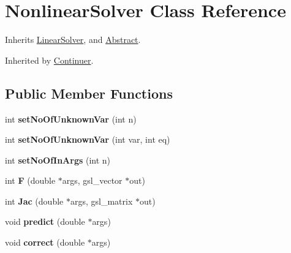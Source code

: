 \hypertarget{class_nonlinear_solver}{
\section{NonlinearSolver Class Reference}
\label{class_nonlinear_solver}
}


Inherits \hyperlink{class_linear_solver}{LinearSolver}, and \hyperlink{class_abstract}{Abstract}.

Inherited by \hyperlink{class_continuer}{Continuer}.\subsection*{Public Member Functions}
\begin{DoxyCompactItemize}
\item 
\hypertarget{class_nonlinear_solver_a0199c1755fe89dad01ea9855f22f32d4}{
int {\bfseries setNoOfUnknownVar} (int n)}
\label{class_nonlinear_solver_a0199c1755fe89dad01ea9855f22f32d4}

\item 
\hypertarget{class_nonlinear_solver_abb22c855c950b52df00301f5d5557d09}{
int {\bfseries setNoOfUnknownVar} (int var, int eq)}
\label{class_nonlinear_solver_abb22c855c950b52df00301f5d5557d09}

\item 
\hypertarget{class_nonlinear_solver_a053187f06cc0326b48504d9d50738fd8}{
int {\bfseries setNoOfInArgs} (int n)}
\label{class_nonlinear_solver_a053187f06cc0326b48504d9d50738fd8}

\item 
\hypertarget{class_nonlinear_solver_a0b04d8997db805338504584f400bd89b}{
int {\bfseries F} (double $\ast$args, gsl\_\-vector $\ast$out)}
\label{class_nonlinear_solver_a0b04d8997db805338504584f400bd89b}

\item 
\hypertarget{class_nonlinear_solver_aa501af12fe0e1c93a602f11d08b4f9d1}{
int {\bfseries Jac} (double $\ast$args, gsl\_\-matrix $\ast$out)}
\label{class_nonlinear_solver_aa501af12fe0e1c93a602f11d08b4f9d1}

\item 
\hypertarget{class_nonlinear_solver_afda0787a32bd2ba86dfc9398b6a2b2f2}{
void {\bfseries predict} (double $\ast$args)}
\label{class_nonlinear_solver_afda0787a32bd2ba86dfc9398b6a2b2f2}

\item 
\hypertarget{class_nonlinear_solver_ab25dbff2a16e19c28490180a59b96c05}{
void {\bfseries correct} (double $\ast$args)}
\label{class_nonlinear_solver_ab25dbff2a16e19c28490180a59b96c05}

\end{DoxyCompactItemize}
